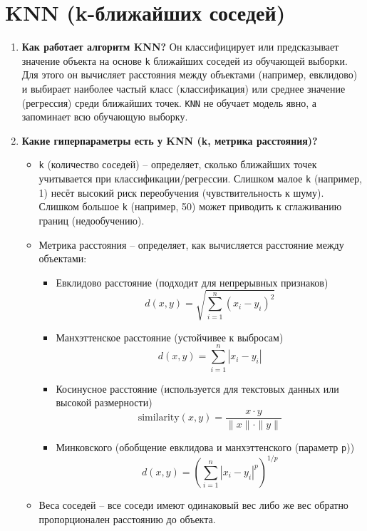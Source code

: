 \documentclass{article}
\begin{document}
\section{KNN (k-ближайших соседей)}
\begin{enumerate}
    \item \textbf{Как работает алгоритм KNN?}
        Он классифицирует или предсказывает значение объекта на основе \texttt{k} ближайших соседей из обучающей выборки. Для этого он вычисляет расстояния между объектами (например, евклидово) и выбирает наиболее частый класс (классификация) или среднее значение (регрессия) среди ближайших точек. \texttt{KNN} не обучает модель явно, а запоминает всю обучающую выборку.
    \item \textbf{Какие гиперпараметры есть у KNN (k, метрика расстояния)?}
        \begin{itemize}
            \item \texttt{k} (количество соседей) -- определяет, сколько ближайших точек учитывается при классификации/регрессии. Слишком малое \texttt{k} (например, 1) несёт высокий риск переобучения (чувствительность к шуму). Слишком большое \texttt{k} (например, 50) может приводить к сглаживанию границ (недообучению).
            \item Метрика расстояния -- определяет, как вычисляется расстояние между объектами:
                \begin{itemize}
                    \item Евклидово расстояние (подходит для непрерывных признаков)
                    $$
                        d(x, y) = \sqrt{\sum_{i=1}^{n} (x_i - y_i)^2}
                    $$
                    \item Манхэттенское расстояние (устойчивее к выбросам)
                    $$
                        d(x, y) = \sum_{i=1}^{n} |x_i - y_i|
                    $$
                    \item Косинусное расстояние (используется для текстовых данных или высокой размерности)
                    $$
                        \text{similarity}(x, y) = \frac{x \cdot y}{\|x\| \cdot \|y\|}
                    $$
                    \item Минковского (обобщение евклидова и манхэттенского (параметр \texttt{p}))
                    $$
                        d(x, y) = \left( \sum_{i=1}^{n} |x_i - y_i|^p \right)^{1/p}
                    $$
                \end{itemize}
            \item Веса соседей -- все соседи имеют одинаковый вес либо же вес обратно пропорционален расстоянию до объекта.

\end{itemize}
\end{enumerate}
\end{document}
